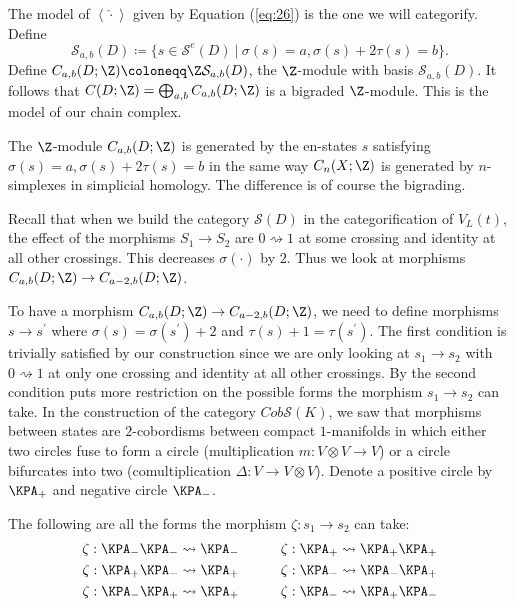 The model of $\left< \hat\cdot \right>$ given by Equation (\ref{eq:26}) is the one we will categorify. Define
\begin{equation}
\label{eq:27}
\mathcal{S}_{a,b}(D) \coloneqq \{ s \in \mathcal{S}^e(D) \ | \ \sigma(s) = a, \sigma(s) + 2\tau(s) = b \}.
\end{equation}
Define $C_{a,b}(D; \Z) \coloneqq \Z\mathcal{S}_{a,b}(D) $, the $\Z$-module with basis $\mathcal{S}_{a,b}(D)$. It follows that $C(D; \Z) = \bigoplus_{a,b}C_{a,b}(D; \Z)$ is a bigraded $\Z$-module. This is the model of our chain complex.

\begin{remark}
The $\Z$-module $C_{a,b}(D; \Z)$ is generated by the en-states $s$ satisfying $\sigma(s) = a, \sigma(s) + 2\tau(s) = b$ in the same way $C_n(X; \Z)$ is generated by $n$-simplexes in simplicial homology. The difference is of course the bigrading.
\end{remark}

Recall that when we build the category $\mathcal{S}(D)$ in the categorification of $V_L(t)$, the effect of the morphisms $S_1 \to S_2$ are $0 \rightsquigarrow 1$ at some crossing and identity at all other crossings. This decreases $\sigma(\cdot)$ by $2$. Thus we look at morphisms $C_{a,b}(D; \Z) \to C_{a-2,b}(D; \Z)$.

To have a morphism $C_{a,b}(D; \Z) \to C_{a-2,b}(D; \Z)$, we need to define morphisms $s \to s^{\prime}$ where $\sigma(s) = \sigma(s^{\prime}) + 2$ and $\tau(s) + 1 = \tau(s^{\prime})$. The first condition is trivially satisfied by our construction since we are only looking at $s_1 \to s_2$ with $0 \rightsquigarrow 1$ at only one crossing and identity at all other crossings. By the second condition puts more restriction on the possible forms the morphism $s_1 \to s_2$ can take. In the construction of the category $Cob \mathcal S(K)$, we saw that morphisms between states are $2$-cobordisms between compact $1$-manifolds in which either two circles fuse to form a circle (multiplication $m : V\otimes V \to V$) or a circle bifurcates into two (comultiplication $\Delta : V \to V\otimes V$). Denote a positive circle by $\KPA_+$ and negative circle $\KPA_-$.

\begin{proposition}
\label{sec:categ-left-hatcd}
The following are all the forms the morphism $\zeta : s_1 \to s_2$ can take: 
\begin{align}
\label{eq:22}
\begin{split}
  \zeta : \KPA_- \KPA_- \rightsquigarrow \KPA_- &\hspace*{3em}\zeta : \KPA_+ \rightsquigarrow \KPA_+ \KPA_+ \\
  \zeta : \KPA_+ \KPA_- \rightsquigarrow \KPA_+ &\hspace*{3em}\zeta : \KPA_- \rightsquigarrow \KPA_- \KPA_+\\
  \zeta : \KPA_- \KPA_+ \rightsquigarrow \KPA_+ &\hspace*{3em}\zeta : \KPA_- \rightsquigarrow \KPA_+ \KPA_-
\end{split} 
\end{align}
\end{proposition}

